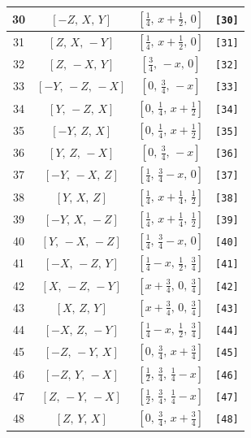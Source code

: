 \documentclass[fleqn,8pt]{jsarticle}
\begin{document}
\begin{longtable}{cccc}
30 & $\left[ - Z,\, X,\, Y \right]$ & $\left[ \frac{1}{4},\, x + \frac{1}{2},\, 0 \right]$ & {\tt [30]} \\ \hline
31 & $\left[ Z,\, X,\, - Y \right]$ & $\left[ \frac{1}{4},\, x + \frac{1}{2},\, 0 \right]$ & {\tt [31]} \\ \hline
32 & $\left[ Z,\, - X,\, Y \right]$ & $\left[ \frac{3}{4},\, - x,\, 0 \right]$ & {\tt [32]} \\ \hline
33 & $\left[ - Y,\, - Z,\, - X \right]$ & $\left[ 0,\, \frac{3}{4},\, - x \right]$ & {\tt [33]} \\ \hline
34 & $\left[ Y,\, - Z,\, X \right]$ & $\left[ 0,\, \frac{1}{4},\, x + \frac{1}{2} \right]$ & {\tt [34]} \\ \hline
35 & $\left[ - Y,\, Z,\, X \right]$ & $\left[ 0,\, \frac{1}{4},\, x + \frac{1}{2} \right]$ & {\tt [35]} \\ \hline
36 & $\left[ Y,\, Z,\, - X \right]$ & $\left[ 0,\, \frac{3}{4},\, - x \right]$ & {\tt [36]} \\ \hline
37 & $\left[ - Y,\, - X,\, Z \right]$ & $\left[ \frac{1}{4},\, \frac{3}{4} - x,\, 0 \right]$ & {\tt [37]} \\ \hline
38 & $\left[ Y,\, X,\, Z \right]$ & $\left[ \frac{1}{4},\, x + \frac{1}{4},\, \frac{1}{2} \right]$ & {\tt [38]} \\ \hline
39 & $\left[ - Y,\, X,\, - Z \right]$ & $\left[ \frac{1}{4},\, x + \frac{1}{4},\, \frac{1}{2} \right]$ & {\tt [39]} \\ \hline
40 & $\left[ Y,\, - X,\, - Z \right]$ & $\left[ \frac{1}{4},\, \frac{3}{4} - x,\, 0 \right]$ & {\tt [40]} \\ \hline
41 & $\left[ - X,\, - Z,\, Y \right]$ & $\left[ \frac{1}{4} - x,\, \frac{1}{2},\, \frac{3}{4} \right]$ & {\tt [41]} \\ \hline
42 & $\left[ X,\, - Z,\, - Y \right]$ & $\left[ x + \frac{3}{4},\, 0,\, \frac{3}{4} \right]$ & {\tt [42]} \\ \hline
43 & $\left[ X,\, Z,\, Y \right]$ & $\left[ x + \frac{3}{4},\, 0,\, \frac{3}{4} \right]$ & {\tt [43]} \\ \hline
44 & $\left[ - X,\, Z,\, - Y \right]$ & $\left[ \frac{1}{4} - x,\, \frac{1}{2},\, \frac{3}{4} \right]$ & {\tt [44]} \\ \hline
45 & $\left[ - Z,\, - Y,\, X \right]$ & $\left[ 0,\, \frac{3}{4},\, x + \frac{3}{4} \right]$ & {\tt [45]} \\ \hline
46 & $\left[ - Z,\, Y,\, - X \right]$ & $\left[ \frac{1}{2},\, \frac{3}{4},\, \frac{1}{4} - x \right]$ & {\tt [46]} \\ \hline
47 & $\left[ Z,\, - Y,\, - X \right]$ & $\left[ \frac{1}{2},\, \frac{3}{4},\, \frac{1}{4} - x \right]$ & {\tt [47]} \\ \hline
48 & $\left[ Z,\, Y,\, X \right]$ & $\left[ 0,\, \frac{3}{4},\, x + \frac{3}{4} \right]$ & {\tt [48]} \\
\end{longtable}
\end{document}

